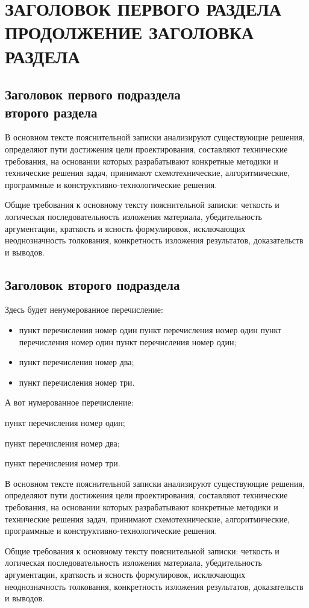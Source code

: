 \section[Заголовок первого раздела]{%
  ЗАГОЛОВОК ПЕРВОГО РАЗДЕЛА \\
  ПРОДОЛЖЕНИЕ ЗАГОЛОВКА РАЗДЕЛА
}

\subsection{%
  Заголовок первого подраздела \\
  второго раздела
}

В основном тексте пояснительной записки анализируют существующие решения,
определяют пути достижения цели проектирования, составляют технические требования,
на основании которых разрабатывают конкретные методики и технические решения задач,
принимают схемотехнические, алгоритмические, программные и
конструктивно-технологические решения.

Общие требования к основному тексту пояснительной записки: четкость
и логическая последовательность изложения материала, убедительность
аргументации, краткость и ясность формулировок, исключающих неоднозначность
толкования, конкретность изложения результатов, доказательств и выводов.

\subsection{Заголовок второго подраздела}

Здесь будет ненумерованное перечисление:
\begin{itemize}
  \item пункт перечисления номер один пункт перечисления номер один
    пункт перечисления номер один пункт перечисления номер один;
  \item пункт перечисления номер два;
  \item пункт перечисления номер три.
\end{itemize}

А вот нумерованное перечисление:
\begin{reflist}
  \item пункт перечисления номер один;
  \item пункт перечисления номер два;
  \item пункт перечисления номер три.
\end{reflist}

В основном тексте пояснительной записки анализируют существующие решения,
определяют пути достижения цели проектирования, составляют технические требования,
на основании которых разрабатывают конкретные методики и технические решения задач,
принимают схемотехнические, алгоритмические, программные и
конструктивно-технологические решения.

Общие требования к основному тексту пояснительной записки: четкость
и логическая последовательность изложения материала, убедительность
аргументации, краткость и ясность формулировок, исключающих неоднозначность
толкования, конкретность изложения результатов, доказательств и выводов.
